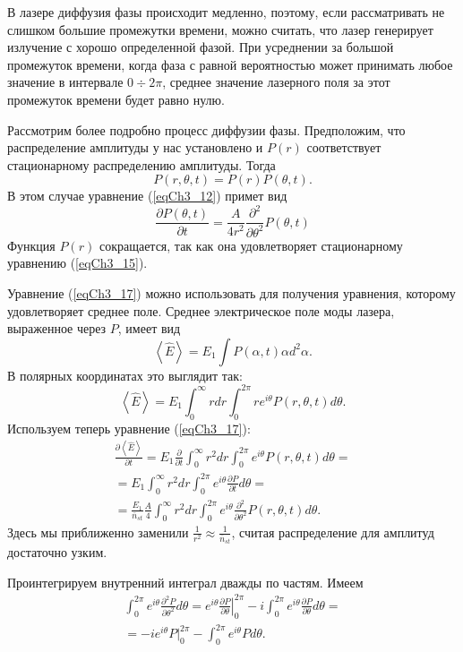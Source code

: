 В лазере диффузия фазы происходит медленно, поэтому, если
рассматривать не слишком большие промежутки времени, можно считать,
что лазер генерирует излучение с хорошо определенной фазой. При
усреднении за большой промежуток времени, когда фаза с равной
вероятностью может принимать любое значение в интервале  $0 \div 2
\pi$,  среднее значение лазерного поля за этот промежуток времени 
будет равно нулю.  

Рассмотрим более подробно процесс диффузии фазы. Предположим, что
распределение амплитуды у нас установлено и $P\left(r\right)$
соответствует стационарному распределению амплитуды. Тогда
\[
P\left(r, \theta, t\right) = P\left(r\right) P\left(\theta, t\right).
\]
В этом случае уравнение (\ref{eqCh3_12}) примет вид 
\begin{equation}
\frac{\partial P \left(\theta, t\right)}{\partial t} = 
\frac{A}{4 r^2}
\frac{\partial^2}{\partial \theta^2}
P \left(\theta, t\right)
\label{eqCh3_17}
\end{equation}
Функция $P\left(r\right)$ сокращается, так как она удовлетворяет
стационарному уравнению (\ref{eqCh3_15}). 

Уравнение (\ref{eqCh3_17}) можно использовать для получения уравнения,
которому удовлетворяет среднее поле. Среднее электрическое поле моды
лазера, выраженное через $P$, имеет вид  
\[
\left<\hat{E}\right> = E_1 \int P\left(\alpha, t\right) \alpha d^2
\alpha.
\]
В полярных координатах это выглядит так:
\[
\left<\hat{E}\right> = E_1 \int_{0}^{\infty}r dr \int_0^{2 \pi}r e^{i
  \theta} P\left(r, \theta, t\right) d \theta.
\]
Используем теперь уравнение (\ref{eqCh3_17}):
\begin{eqnarray}
\frac{\partial \left<\hat{E}\right>}{\partial t}
= E_1 \frac{\partial}{\partial t} \int_{0}^{\infty}r^2 dr \int_0^{2
  \pi} e^{i
  \theta} P\left(r, \theta, t\right) d \theta = 
\nonumber \\
= E_1 \int_0^{\infty}r^2 dr \int_0^{2\pi}e^{i\theta}\frac{\partial
  P}{\partial t} d \theta
=
\nonumber \\
= \frac{E_1}{\bar{n}_{st}} \frac{A}{4}
\int_{0}^{\infty}r^2 dr \int_0^{2 \pi}e^{i
  \theta} \frac{\partial^2}{\partial \theta^2} P\left(r, \theta,
t\right) d \theta. 
\label{eqCh3_18}
\end{eqnarray}
Здесь мы приближенно заменили $\frac{1}{r^2} \approx
\frac{1}{\bar{n}_{st}}$, считая распределение для амплитуд достаточно
узким. 

Проинтегрируем внутренний интеграл дважды по частям. Имеем
\begin{eqnarray}
\int_0^{2 \pi} e^{i \theta}
\frac{\partial^2 P}{\partial \theta^2} d \theta = 
e^{i \theta} \left.\frac{\partial P}{\partial \theta}\right|_0^{2 \pi}
- i \int_0^{2 \pi} e^{i \theta}
\frac{\partial P}{\partial \theta} d \theta = 
\nonumber \\
= -i e^{i \theta} \left. P \right|_0^{2 \pi} - 
\int_0^{2 \pi} e^{i \theta} P d \theta.
\label{eqCh3_19}
\end{eqnarray}

